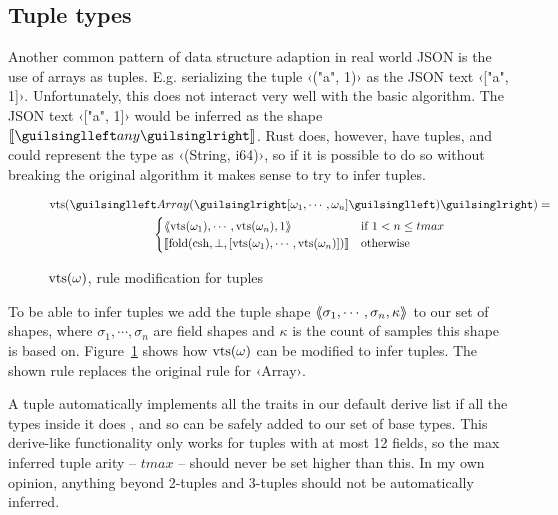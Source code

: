 

\subsection{Tuple types}
\label{sec:ext-tuples}

Another common pattern of data structure adaption in real world JSON is the use of arrays as tuples. E.g. serializing the tuple ‹("a", 1)› as the JSON text ‹["a", 1]›. Unfortunately, this does not interact very well with the basic algorithm. The JSON text ‹["a", 1]› would be inferred as the shape $\vect{‹any›}$. Rust does, however, have tuples, and could represent the type as ‹(String, i64)›, so if it is possible to do so without breaking the original algorithm it makes sense to try to infer tuples.

\begin{figure}[ht!]
\begin{gather*}
\shap(‹Array(›[\omega_1, \cdots, \omega_n]‹)›) = \\ \begin{cases}
  \tupl{ \shap(\omega_1), \cdots, \shap(\omega_n), 1 }   &  \text{if } 1 < n \leq tmax \\
  \vect{ \fold(\csh, \bot, [\shap(\omega_1), \cdots, \shap(\omega_n)]) } & \text{otherwise}
\end{cases}
\end{gather*}
\caption{$\operatorname{vts}(\omega)$, rule modification for tuples}
\label{fig:shap-tuple}
\end{figure}

To be able to infer tuples we add the tuple shape $\langle\kern-0.25em\langle  \sigma_1, \cdots, \sigma_n, \kappa  \rangle\kern-0.25em\rangle$ to our set of shapes, where $ \sigma_1, \cdots, \sigma_n $ are field shapes and $\kappa$ is the count of samples this shape is based on. Figure~\ref{fig:shap-tuple} shows how $\operatorname{vts}(\omega)$ can be modified to infer tuples. The shown rule replaces the original rule for ‹Array›.

A tuple automatically implements all the traits in our default derive list if all the types inside it does \cite[primitive std::tuple]{rust-std-docs}, and so can be safely added to our set of base types. This derive-like functionality only works for tuples with at most 12 fields, so the max inferred tuple arity -- $tmax$ -- should never be set higher than this. In my own opinion, anything beyond 2-tuples and 3-tuples should not be automatically inferred.

